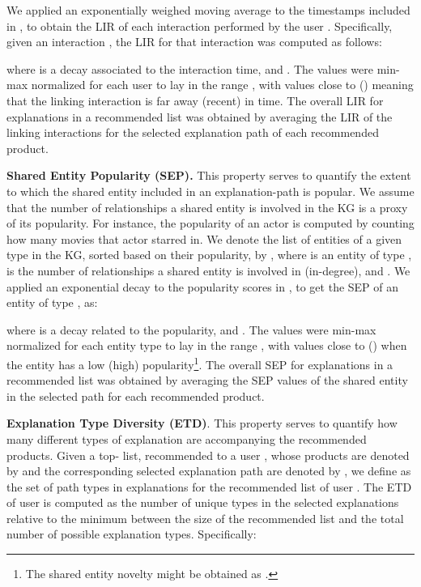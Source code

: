 \documentclass[sigconf]{acmart}
\begin{document}
We applied an exponentially weighed moving average to the timestamps included in , to obtain the LIR of each interaction performed by the user . 
Specifically, given an interaction , the LIR for that interaction was computed as follows: 

\vspace{-2mm}


where  is a decay associated to the interaction time, and . 
The  values were min-max normalized for each user to lay in the range , with values close to  () meaning that the linking interaction is far away (recent) in time. 
The overall LIR for explanations in a recommended list was obtained by averaging the LIR of the linking interactions for the selected explanation path of each recommended product.

\vspace{1mm}\noindent\textbf{Shared Entity Popularity (SEP).} 
This property serves to quantify the extent to which the shared entity included in an explanation-path is popular. 
We assume that the number of relationships a shared entity is involved in the KG is a proxy of its popularity. 
For instance, the popularity of an actor is computed by counting how many movies that actor starred in.
We denote the list of entities of a given type  in the KG, sorted based on their popularity, by , where  is an entity of type ,  is the number of relationships a shared entity is involved in (in-degree), and  . 
We applied an exponential decay to the popularity scores in , to get the SEP of an entity of type , as: 

\vspace{-2mm}


where  is a decay related to the popularity, and . 
The  values were min-max normalized for each entity type to lay in the range , with values close to  () when the entity has a low (high) popularity\footnote{The shared entity novelty might be obtained as .}. 
The overall SEP for explanations in a recommended list was obtained by averaging the SEP values of the shared entity in the selected path for each recommended product.

\vspace{1mm}\noindent\textbf{Explanation Type Diversity (ETD)}. 
This property serves to quantify how many different types of explanation are accompanying the recommended products. 
Given a top- list, recommended to a user , whose products are denoted by  and the corresponding selected explanation path are denoted by , we define as  the set of path types in explanations for the recommended list of user . 
The ETD of user  is computed as the number of unique types in the selected explanations relative to the minimum between the size of the recommended list  and the total number of possible explanation types. 
Specifically:
\end{document}
